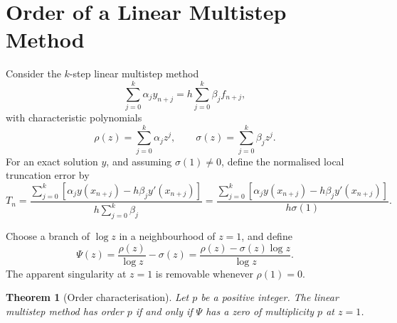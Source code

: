 \documentclass[11pt,a4paper]{article}
\numberwithin{equation}{section}
\theoremstyle{spacedplain}
\newtheorem{theorem}{Theorem}[section]
\theoremstyle{spaceddefinition}
\theoremstyle{spacedremark}
\begin{document}
\section{Order of a Linear Multistep Method}

Consider the \(k\)-step linear multistep method
\[
  \sum_{j=0}^k\alpha_jy_{n+j}
  =h\sum_{j=0}^k\beta_jf_{n+j},
\]
with characteristic polynomials
\[
  \rho(z)=\sum_{j=0}^k\alpha_jz^j,
  \qquad
  \sigma(z)=\sum_{j=0}^k\beta_jz^j.
\]
For an exact solution \(y\), and assuming \(\sigma(1)\ne0\), define the
normalised local truncation error by
\[
  T_n=
  \frac{
    \displaystyle
    \sum_{j=0}^k
    \left[
      \alpha_jy(x_{n+j})-h\beta_jy'(x_{n+j})
    \right]
  }{
    \displaystyle h\sum_{j=0}^k\beta_j
  }
  =
  \frac{
    \displaystyle
    \sum_{j=0}^k
    \left[
      \alpha_jy(x_{n+j})-h\beta_jy'(x_{n+j})
    \right]
  }{h\sigma(1)}.
\]

Choose a branch of \(\log z\) in a neighbourhood of \(z=1\), and define
\[
  \Psi(z)=\frac{\rho(z)}{\log z}-\sigma(z)
  =\frac{\rho(z)-\sigma(z)\log z}{\log z}.
\]
The apparent singularity at \(z=1\) is removable whenever
\(\rho(1)=0\).

\begin{theorem}[Order characterisation]
Let \(p\) be a positive integer.  The linear multistep method has order
\(p\) if and only if \(\Psi\) has a zero of multiplicity \(p\) at
\(z=1\).
\end{theorem}
\end{document}
